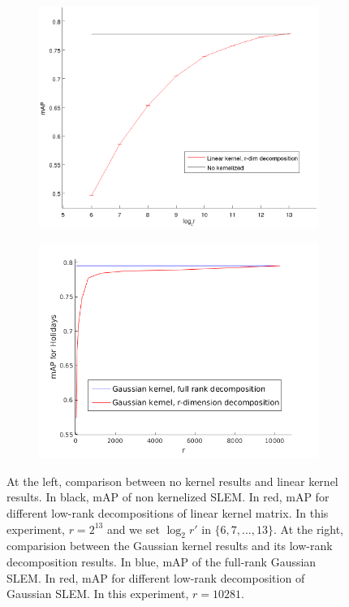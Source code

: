 \begin{figure}[!h]
\centering
\begin{subfigure}[b]{0.48\textwidth}
\includegraphics[width=\textwidth]{None_vs_linear.png}
\end{subfigure}
\begin{subfigure}[b]{0.48\textwidth}
\includegraphics[width=\textwidth]{rbf_decomposition_nolog.png}
\end{subfigure}
\caption{At the left, comparison between no kernel results and linear kernel results. In black, mAP of non kernelized SLEM. In red, mAP for different low-rank decompositions of linear kernel matrix. In this experiment, $r=2^{13}$ and we set $\log_2 r'$ in $\{6, 7,...,13\}$. At the right, comparision between the Gaussian kernel results and its low-rank decomposition results. In blue, mAP of the full-rank Gaussian SLEM. In red, mAP for different low-rank decomposition of Gaussian SLEM. In this experiment, $r=10281$.}
\label{no.ker.vs.linear2}
\end{figure}

